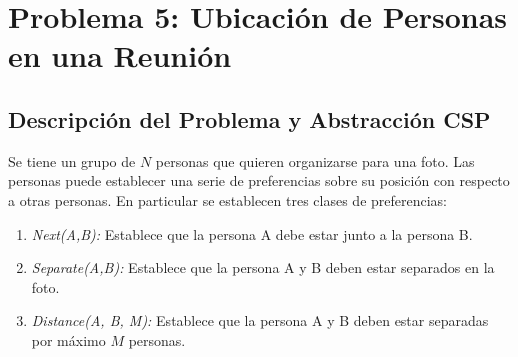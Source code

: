 \section{Problema 5: Ubicación de Personas en una Reunión}

\subsection{Descripción del Problema y Abstracción CSP}

Se tiene un grupo de $N$ personas que quieren organizarse para una foto. Las personas puede establecer una serie de preferencias sobre su posición con respecto a otras personas. En particular se establecen tres clases de preferencias:
\begin{enumerate}
    \item \textit{Next(A,B):} Establece que la persona A debe estar junto a la persona B.
    \item \textit{Separate(A,B):} Establece que la persona A y B deben estar separados en la foto.
    \item \textit{Distance(A, B, M):} Establece que la persona A y B deben estar separadas por máximo $M$ personas.
\end{enumerate}
